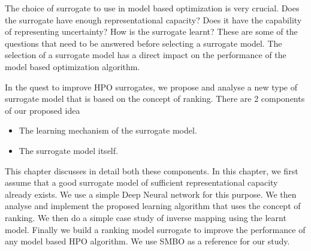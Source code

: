 \documentclass[12pt, twoside, ngerman]{report}
\begin{document}

The choice of surrogate to use in model based optimization is very crucial.
Does the surrogate have enough representational capacity?
Does it have the capability of representing uncertainty?
How is the surrogate learnt?
These are some of the questions that need to be answered before selecting a surrogate model.
The selection of a surrogate model has a direct impact on the performance of the model based optimization algorithm.

In the quest to improve HPO surrogates,  we propose and analyse a new type of surrogate model that is based on the concept of ranking.
There are 2 components of our proposed idea

\begin{itemize}
\item The learning mechanism of the surrogate model.
\item The surrogate model itself.
\end{itemize}

This chapter discusses in detail both these components.
In this chapter,  we first assume that a good surrogate model of sufficient representational capacity already exists.
We use a simple Deep Neural network for this purpose.
We then analyse and implement the proposed learning algorithm that uses the concept of ranking.
We then do a simple case study of inverse mapping using the learnt model.
Finally we build a ranking model surrogate to improve the performance of any model based HPO algorithm.
We use SMBO as a reference for our study.
\end{document}
